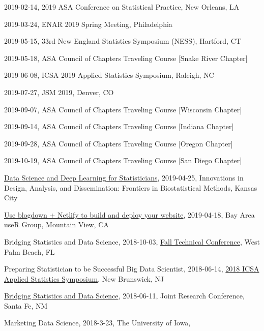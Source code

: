 \documentclass[11pt,]{article}
\providecommand{\tightlist}{%
  \setlength{\itemsep}{0pt}\setlength{\parskip}{0pt}}
\renewenvironment{itemize}{
  \begin{list}{}{
    \setlength{\leftmargin}{1.5em}
  }
}{
  \end{list}
}
\begin{document}
\begin{itemize}
  \begin{itemize}
  \tightlist
  \item
    2019-02-14, 2019 ASA Conference on Statistical Practice, New
    Orleans, LA
  \item
    2019-03-24, ENAR 2019 Spring Meeting, Philadelphia
  \item
    2019-05-15, 33rd New England Statistics Symposium (NESS), Hartford,
    CT
  \item
    2019-05-18, ASA Council of Chapters Traveling Course {[}Snake River
    Chapter{]}
  \item
    2019-06-08, ICSA 2019 Applied Statistics Symposium, Raleigh, NC
  \item
    2019-07-27, JSM 2019, Denver, CO
  \item
    2019-09-07, ASA Council of Chapters Traveling Course {[}Wisconsin
    Chapter{]}
  \item
    2019-09-14, ASA Council of Chapters Traveling Course {[}Indiana
    Chapter{]}
  \item
    2019-09-28, ASA Council of Chapters Traveling Course {[}Oregon
    Chapter{]}
  \item
    2019-10-19, ASA Council of Chapters Traveling Course {[}San Diego
    Chapter{]}
  \end{itemize}
\item
  \href{https://idad2019.netlify.com/}{Data Science and Deep Learning
  for Statisticians}, 2019-04-25, Innovations in Design, Analysis, and
  Dissemination: Frontiers in Biostatistical Methods, Kansas City
\item
  \href{https://barug2019.netlify.com/}{Use blogdown + Netlify to build
  and deploy your website}, 2019-04-18, Bay Area useR Group, Mountain
  View, CA
\item
  Bridging Statistics and Data Science, 2018-10-03,
  \href{http://www.falltechnicalconference.org/short-courses/}{Fall
  Technical Conference}, West Palm Beach, FL
\item
  Preparing Statistician to be Successful Big Data Scientist,
  2018-06-14,
  \href{http://www.icsa.org/icsa_login/symposium2018/main.html}{2018
  ICSA Applied Statistics Symposium}, New Brunswick, NJ
\item
  \href{http://www.cvent.com/events/joint-research-conference/custom-37-2bf39a1d96194e5584e2d22a70df0c31.aspx}{Bridging
  Statistics and Data Science}, 2018-06-11, Joint Research Conference,
  Santa Fe, NM
\item
  Marketing Data Science, 2018-3-23, The University of Iowa,

\end{itemize}
\end{document}
